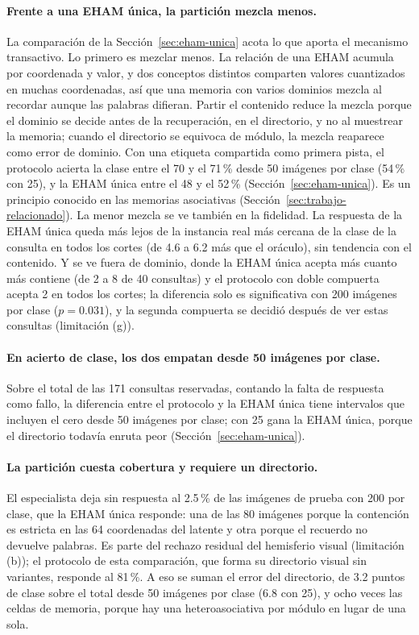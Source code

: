 \paragraph{Frente a una EHAM única, la partición mezcla menos.}
La comparación de la Sección~\ref{sec:eham-unica} acota lo que aporta el mecanismo
transactivo.
Lo primero es mezclar menos.
La relación de una EHAM acumula por coordenada y valor, y dos conceptos distintos
comparten valores cuantizados en muchas coordenadas, así que una memoria con varios
dominios mezcla al recordar aunque las palabras difieran.
Partir el contenido reduce la mezcla porque el dominio se decide antes de la
recuperación, en el directorio, y no al muestrear la memoria; cuando el directorio se
equivoca de módulo, la mezcla reaparece como error de dominio.
Con una etiqueta compartida como primera pista, el protocolo acierta la clase entre el
70 y el 71\,\% desde 50 imágenes por clase (54\,\% con 25), y la EHAM única entre el
48 y el 52\,\% (Sección~\ref{sec:eham-unica}).
Es un principio conocido en las memorias asociativas
(Sección~\ref{sec:trabajo-relacionado}).
La menor mezcla se ve también en la fidelidad.
La respuesta de la EHAM única queda más lejos de la instancia real más cercana de la
clase de la consulta en todos los cortes (de 4.6 a 6.2 más que el oráculo), sin
tendencia con el contenido.
Y se ve fuera de dominio, donde la EHAM única acepta más cuanto más contiene (de 2 a 8
de 40 consultas) y el protocolo con doble compuerta acepta 2 en todos los cortes; la
diferencia solo es significativa con 200 imágenes por clase ($p = 0.031$), y la segunda
compuerta se decidió después de ver estas consultas (limitación (g)).

\paragraph{En acierto de clase, los dos empatan desde 50 imágenes por clase.}
Sobre el total de las 171 consultas reservadas, contando la falta de respuesta como
fallo, la diferencia entre el protocolo y la EHAM única tiene intervalos que incluyen el
cero desde 50 imágenes por clase; con 25 gana la EHAM única, porque el directorio
todavía enruta peor (Sección~\ref{sec:eham-unica}).

\paragraph{La partición cuesta cobertura y requiere un directorio.}
El especialista deja sin respuesta al 2.5\,\% de las imágenes de prueba con 200 por
clase, que la EHAM única responde: una de las 80 imágenes porque la contención es
estricta en las 64 coordenadas del latente y otra porque el recuerdo no devuelve palabras.
Es parte del rechazo residual del hemisferio visual (limitación (b)); el protocolo de
esta comparación, que forma su directorio visual sin variantes, responde al 81\,\%.
A eso se suman el error del directorio, de 3.2 puntos de clase sobre el total desde 50
imágenes por clase (6.8 con 25), y ocho veces las celdas de memoria, porque hay una
heteroasociativa por módulo en lugar de una sola.

